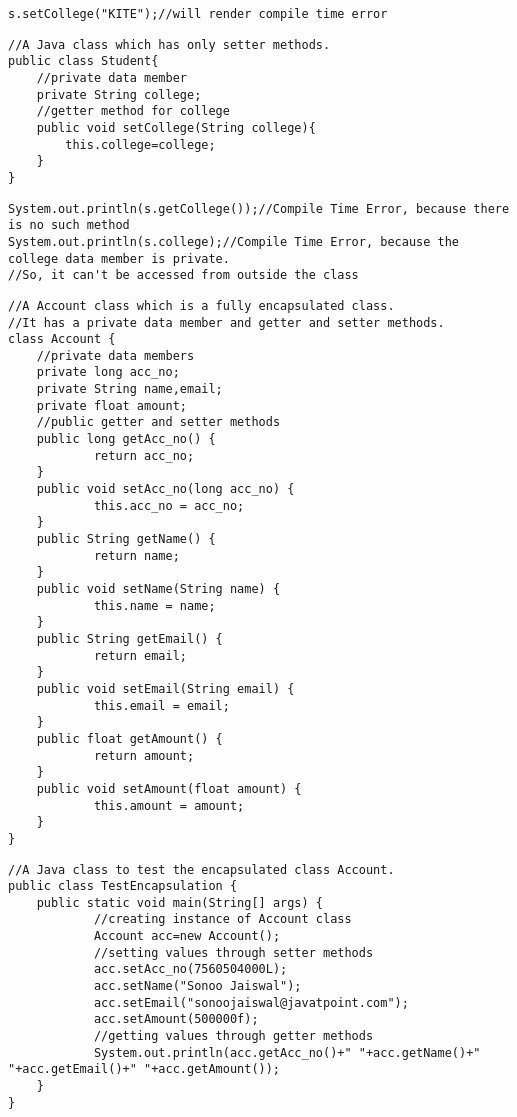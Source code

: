 \documentclass{book}
\def\lthtmlcheckvsize{\ifdim\ht\sizebox<\vsize 
  \ifdim\wd\sizebox<\hsize\expandafter\hfill\fi \expandafter\vfill
  \else\expandafter\vss\fi}%
\begin{document}
{\newpage\clearpage
{}%
\begin{lstlisting}
s.setCollege("KITE");//will render compile time error  
\end{lstlisting}%
\lthtmlfigureZ
\lthtmlcheckvsize\clearpage}

{\newpage\clearpage
{}%
\begin{lstlisting}
//A Java class which has only setter methods.  
public class Student{  
	//private data member  
	private String college;  
	//getter method for college  
	public void setCollege(String college){  
		this.college=college;  
	}  
}  
\end{lstlisting}%
\lthtmlfigureZ
\lthtmlcheckvsize\clearpage}

{\newpage\clearpage
{}%
\begin{lstlisting}
System.out.println(s.getCollege());//Compile Time Error, because there is no such method  
System.out.println(s.college);//Compile Time Error, because the college data member is private.   
//So, it can't be accessed from outside the class  
\end{lstlisting}%
\lthtmlfigureZ
\lthtmlcheckvsize\clearpage}

{\newpage\clearpage
{}%
\begin{lstlisting}
//A Account class which is a fully encapsulated class.  
//It has a private data member and getter and setter methods.  
class Account {  
	//private data members  
	private long acc_no;  
	private String name,email;  
	private float amount;  
	//public getter and setter methods  
	public long getAcc_no() {  
			return acc_no;  
	}  
	public void setAcc_no(long acc_no) {  
			this.acc_no = acc_no;  
	}  
	public String getName() {  
			return name;  
	}  
	public void setName(String name) {  
			this.name = name;  
	}  
	public String getEmail() {  
			return email;  
	}  
	public void setEmail(String email) {  
			this.email = email;  
	}  
	public float getAmount() {  
			return amount;  
	}  
	public void setAmount(float amount) {  
			this.amount = amount;  
	}  
}  
\end{lstlisting}%
\lthtmlfigureZ
\lthtmlcheckvsize\clearpage}

{\newpage\clearpage
{}%
\begin{lstlisting}
//A Java class to test the encapsulated class Account.  
public class TestEncapsulation {  
	public static void main(String[] args) {  
			//creating instance of Account class  
			Account acc=new Account();  
			//setting values through setter methods  
			acc.setAcc_no(7560504000L);  
			acc.setName("Sonoo Jaiswal");  
			acc.setEmail("sonoojaiswal@javatpoint.com");  
			acc.setAmount(500000f);  
			//getting values through getter methods  
			System.out.println(acc.getAcc_no()+" "+acc.getName()+" "+acc.getEmail()+" "+acc.getAmount());  
	}  
} 
\end{lstlisting}%
\lthtmlfigureZ
\lthtmlcheckvsize\clearpage}
\end{document}
